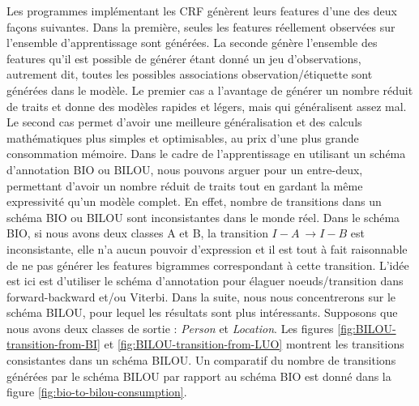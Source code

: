 \documentclass[PhD-Yoann-Dupont.tex]{subfiles}
\begin{document}
Les programmes implémentant les CRF génèrent leurs features d'une des deux façons suivantes. Dans la première, seules les features réellement observées sur l'ensemble d'apprentissage sont générées. La seconde génère l'ensemble des features qu'il est possible de générer étant donné un jeu d'observations, autrement dit, toutes les possibles associations observation/étiquette sont générées dans le modèle. Le premier cas a l'avantage de générer un nombre réduit de traits et donne des modèles rapides et légers, mais qui généralisent assez mal. Le second cas permet d'avoir une meilleure généralisation et des calculs mathématiques plus simples et optimisables, au prix d'une plus grande consommation mémoire. Dans le cadre de l'apprentissage en utilisant un schéma d'annotation BIO ou BILOU, nous pouvons arguer pour un entre-deux, permettant d'avoir un nombre réduit de traits tout en gardant la même expressivité qu'un modèle complet. En effet, nombre de transitions dans un schéma BIO ou BILOU sont inconsistantes dans le monde réel. Dans le schéma BIO, si nous avons deux classes A et B, la transition $I-A\ \rightarrow I-B$ est inconsistante, elle n'a aucun pouvoir d'expression et il est tout à fait raisonnable de ne pas générer les features bigrammes correspondant à cette transition. L'idée est ici est d'utiliser le schéma d'annotation pour élaguer noeuds/transition dans forward-backward et/ou Viterbi. Dans la suite, nous nous concentrerons sur le schéma BILOU, pour lequel les résultats sont plus intéressants. Supposons que nous avons deux classes de sortie : \emph{Person} et \emph{Location}. Les figures \ref{fig:BILOU-transition-from-BI} et \ref{fig:BILOU-transition-from-LUO} montrent les transitions consistantes dans un schéma BILOU. Un comparatif du nombre de transitions générées par le schéma BILOU par rapport au schéma BIO est donné dans la figure \ref{fig:bio-to-bilou-consumption}.
\end{document}
